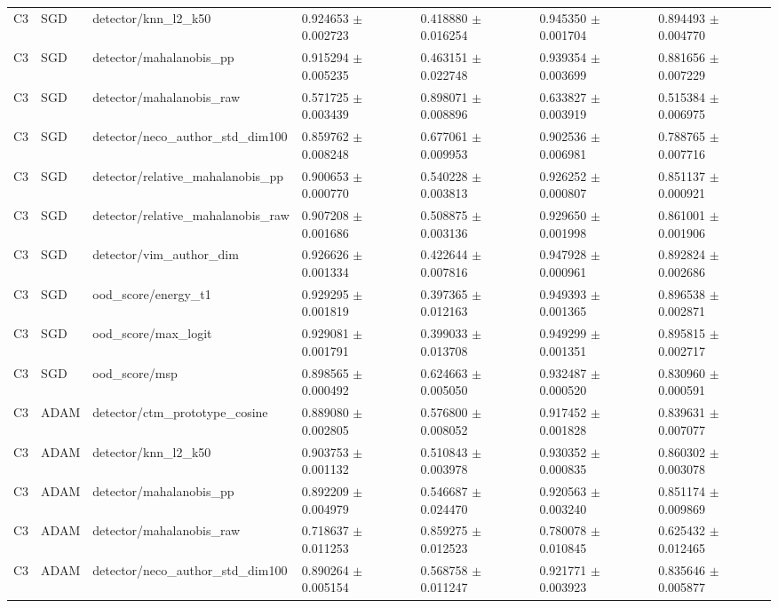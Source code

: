 \begin{longtable}{lllllll}
C3 & SGD & detector/knn\_l2\_k50 & 0.924653 $\pm$ 0.002723 & 0.418880 $\pm$ 0.016254 & 0.945350 $\pm$ 0.001704 & 0.894493 $\pm$ 0.004770 \\
C3 & SGD & detector/mahalanobis\_pp & 0.915294 $\pm$ 0.005235 & 0.463151 $\pm$ 0.022748 & 0.939354 $\pm$ 0.003699 & 0.881656 $\pm$ 0.007229 \\
C3 & SGD & detector/mahalanobis\_raw & 0.571725 $\pm$ 0.003439 & 0.898071 $\pm$ 0.008896 & 0.633827 $\pm$ 0.003919 & 0.515384 $\pm$ 0.006975 \\
C3 & SGD & detector/neco\_author\_std\_dim100 & 0.859762 $\pm$ 0.008248 & 0.677061 $\pm$ 0.009953 & 0.902536 $\pm$ 0.006981 & 0.788765 $\pm$ 0.007716 \\
C3 & SGD & detector/relative\_mahalanobis\_pp & 0.900653 $\pm$ 0.000770 & 0.540228 $\pm$ 0.003813 & 0.926252 $\pm$ 0.000807 & 0.851137 $\pm$ 0.000921 \\
C3 & SGD & detector/relative\_mahalanobis\_raw & 0.907208 $\pm$ 0.001686 & 0.508875 $\pm$ 0.003136 & 0.929650 $\pm$ 0.001998 & 0.861001 $\pm$ 0.001906 \\
C3 & SGD & detector/vim\_author\_dim & 0.926626 $\pm$ 0.001334 & 0.422644 $\pm$ 0.007816 & 0.947928 $\pm$ 0.000961 & 0.892824 $\pm$ 0.002686 \\
C3 & SGD & ood\_score/energy\_t1 & 0.929295 $\pm$ 0.001819 & 0.397365 $\pm$ 0.012163 & 0.949393 $\pm$ 0.001365 & 0.896538 $\pm$ 0.002871 \\
C3 & SGD & ood\_score/max\_logit & 0.929081 $\pm$ 0.001791 & 0.399033 $\pm$ 0.013708 & 0.949299 $\pm$ 0.001351 & 0.895815 $\pm$ 0.002717 \\
C3 & SGD & ood\_score/msp & 0.898565 $\pm$ 0.000492 & 0.624663 $\pm$ 0.005050 & 0.932487 $\pm$ 0.000520 & 0.830960 $\pm$ 0.000591 \\
C3 & ADAM & detector/ctm\_prototype\_cosine & 0.889080 $\pm$ 0.002805 & 0.576800 $\pm$ 0.008052 & 0.917452 $\pm$ 0.001828 & 0.839631 $\pm$ 0.007077 \\
C3 & ADAM & detector/knn\_l2\_k50 & 0.903753 $\pm$ 0.001132 & 0.510843 $\pm$ 0.003978 & 0.930352 $\pm$ 0.000835 & 0.860302 $\pm$ 0.003078 \\
C3 & ADAM & detector/mahalanobis\_pp & 0.892209 $\pm$ 0.004979 & 0.546687 $\pm$ 0.024470 & 0.920563 $\pm$ 0.003240 & 0.851174 $\pm$ 0.009869 \\
C3 & ADAM & detector/mahalanobis\_raw & 0.718637 $\pm$ 0.011253 & 0.859275 $\pm$ 0.012523 & 0.780078 $\pm$ 0.010845 & 0.625432 $\pm$ 0.012465 \\
C3 & ADAM & detector/neco\_author\_std\_dim100 & 0.890264 $\pm$ 0.005154 & 0.568758 $\pm$ 0.011247 & 0.921771 $\pm$ 0.003923 & 0.835646 $\pm$ 0.005877 \\

\end{longtable}
